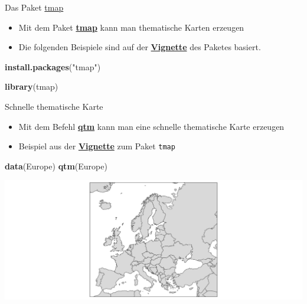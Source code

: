 \documentclass[ignorenonframetext,]{beamer}
\newenvironment{Shaded}{\begin{snugshade}}{\end{snugshade}}
\newcommand{\KeywordTok}[1]{\textcolor[rgb]{0.13,0.29,0.53}{\textbf{#1}}}
\newcommand{\StringTok}[1]{\textcolor[rgb]{0.31,0.60,0.02}{#1}}
\newcommand{\NormalTok}[1]{#1}
\providecommand{\tightlist}{%
  \setlength{\itemsep}{0pt}\setlength{\parskip}{0pt}}
\begin{document}
\begin{frame}[fragile]{Das Paket
\href{https://cran.r-project.org/web/packages/tmap/index.html}{tmap}}

\begin{itemize}
\tightlist
\item
  Mit dem Paket
  \href{http://twitter.com/sharon000/status/593028906820599808/photo/1?ref_src=twsrc\%5Etfw}{\textbf{tmap}}
  kann man thematische Karten erzeugen
\item
  Die folgenden Beispiele sind auf der
  \href{https://cran.r-project.org/web/packages/tmap/vignettes/tmap-nutshell.html}{\textbf{Vignette}}
  des Paketes basiert.
\end{itemize}

\begin{Shaded}
\begin{Highlighting}[]
\KeywordTok{install.packages}\NormalTok{(}\StringTok{"tmap"}\NormalTok{)}
\end{Highlighting}
\end{Shaded}

\begin{Shaded}
\begin{Highlighting}[]
\KeywordTok{library}\NormalTok{(tmap)}
\end{Highlighting}
\end{Shaded}

\end{frame}

\begin{frame}[fragile]{Schnelle thematische Karte}

\begin{itemize}
\item
  Mit dem Befehl
  \href{https://cran.r-project.org/web/packages/tmap/vignettes/tmap-nutshell.html}{\textbf{qtm}}
  kann man eine schnelle thematische Karte erzeugen
\item
  Beispiel aus der
  \href{https://cran.r-project.org/web/packages/tmap/vignettes/tmap-nutshell.html}{\textbf{Vignette}}
  zum Paket \texttt{tmap}
\end{itemize}

\begin{Shaded}
\begin{Highlighting}[]
\KeywordTok{data}\NormalTok{(Europe)}
\KeywordTok{qtm}\NormalTok{(Europe)}
\end{Highlighting}
\end{Shaded}

\includegraphics{slides_all2gether_part1_files/figure-beamer/unnamed-chunk-46-1.pdf}

\end{frame}
\end{document}
